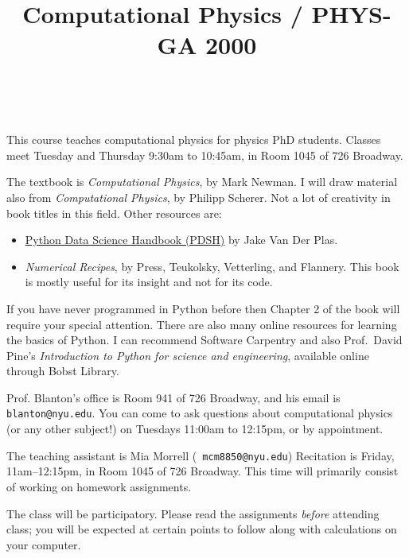 \documentclass[11pt, preprint]{aastex}
\begin{document}
\title{\bf Computational Physics / PHYS-GA 2000}
~
~



\noindent This course teaches computational physics for physics PhD
students. Classes meet Tuesday and Thursday 9:30am to 10:45am, in Room
1045 of 726 Broadway.

\noindent The textbook is {\it Computational Physics}, by Mark
Newman. I will draw material also from {\it Computational Physics}, by
Philipp Scherer. Not a lot of creativity in book titles in this
field. Other resources are:
\begin{itemize}
\item
  \href{https://jakevdp.github.io/PythonDataScienceHandbook/}{Python
    Data Science Handbook (PDSH)} by Jake Van Der Plas.
\item {\it Numerical Recipes}, by Press, Teukolsky, Vetterling, and
  Flannery. This book is mostly useful for its insight and not for its
  code.
\end{itemize}

\noindent If you have never programmed in Python before then Chapter 2
of the book will require your special attention. There are also many
online resources for learning the basics of Python. I can recommend
Software Carpentry and also Prof.~David Pine's {\it Introduction to
  Python for science and engineering}, available online through Bobst
Library.

\noindent Prof. Blanton's office is Room 941 of 726 Broadway, and his
email is {\tt blanton@nyu.edu}. You can come to ask questions about
computational physics (or any other subject!) on Tuesdays 11:00am to
12:15pm, or by appointment.

\noindent The teaching assistant is Mia Morrell ({\tt
  mcm8850@nyu.edu}) Recitation is Friday, 11am--12:15pm, in Room 1045
of 726 Broadway. This time will primarily consist of working on
homework assignments.

\noindent The class will be participatory. Please read the assignments
          {\it before} attending class; you will be expected at
          certain points to follow along with calculations on your
          computer.
\end{document}
